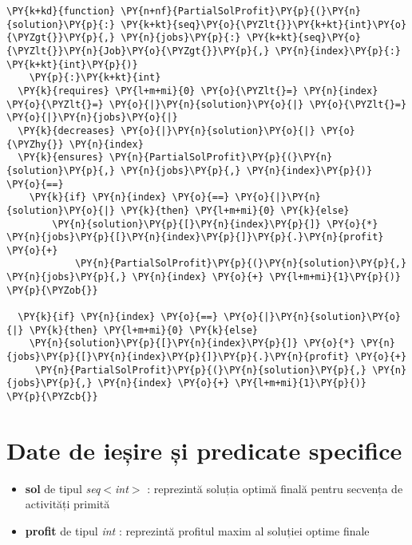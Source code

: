 \begin{Verbatim}[commandchars=\\\{\},fontsize=\small]
\PY{k+kd}{function} \PY{n+nf}{PartialSolProfit}\PY{p}{(}\PY{n}{solution}\PY{p}{:} \PY{k+kt}{seq}\PY{o}{\PYZlt{}}\PY{k+kt}{int}\PY{o}{\PYZgt{}}\PY{p}{,} \PY{n}{jobs}\PY{p}{:} \PY{k+kt}{seq}\PY{o}{\PYZlt{}}\PY{n}{Job}\PY{o}{\PYZgt{}}\PY{p}{,} \PY{n}{index}\PY{p}{:} \PY{k+kt}{int}\PY{p}{)}
    \PY{p}{:}\PY{k+kt}{int}
  \PY{k}{requires} \PY{l+m+mi}{0} \PY{o}{\PYZlt{}=} \PY{n}{index} \PY{o}{\PYZlt{}=} \PY{o}{|}\PY{n}{solution}\PY{o}{|} \PY{o}{\PYZlt{}=} \PY{o}{|}\PY{n}{jobs}\PY{o}{|}
  \PY{k}{decreases} \PY{o}{|}\PY{n}{solution}\PY{o}{|} \PY{o}{\PYZhy{}} \PY{n}{index}
  \PY{k}{ensures} \PY{n}{PartialSolProfit}\PY{p}{(}\PY{n}{solution}\PY{p}{,} \PY{n}{jobs}\PY{p}{,} \PY{n}{index}\PY{p}{)} \PY{o}{==} 
    \PY{k}{if} \PY{n}{index} \PY{o}{==} \PY{o}{|}\PY{n}{solution}\PY{o}{|} \PY{k}{then} \PY{l+m+mi}{0} \PY{k}{else}
        \PY{n}{solution}\PY{p}{[}\PY{n}{index}\PY{p}{]} \PY{o}{*} \PY{n}{jobs}\PY{p}{[}\PY{n}{index}\PY{p}{]}\PY{p}{.}\PY{n}{profit} \PY{o}{+} 
            \PY{n}{PartialSolProfit}\PY{p}{(}\PY{n}{solution}\PY{p}{,} \PY{n}{jobs}\PY{p}{,} \PY{n}{index} \PY{o}{+} \PY{l+m+mi}{1}\PY{p}{)}
\PY{p}{\PYZob{}}

  \PY{k}{if} \PY{n}{index} \PY{o}{==} \PY{o}{|}\PY{n}{solution}\PY{o}{|} \PY{k}{then} \PY{l+m+mi}{0} \PY{k}{else} 
    \PY{n}{solution}\PY{p}{[}\PY{n}{index}\PY{p}{]} \PY{o}{*} \PY{n}{jobs}\PY{p}{[}\PY{n}{index}\PY{p}{]}\PY{p}{.}\PY{n}{profit} \PY{o}{+}
     \PY{n}{PartialSolProfit}\PY{p}{(}\PY{n}{solution}\PY{p}{,} \PY{n}{jobs}\PY{p}{,} \PY{n}{index} \PY{o}{+} \PY{l+m+mi}{1}\PY{p}{)}
\PY{p}{\PYZcb{}}
\end{Verbatim}

\section{Date de ieșire și predicate specifice }
\begin{itemize}
    \item \textbf{sol} de tipul {\textit{seq$<$int$>$}} : reprezintă soluția optimă finală pentru secvența de activități primită 
    \item \textbf{profit} de tipul \textit{int} : reprezintă profitul maxim al soluției optime finale
\end{itemize}

